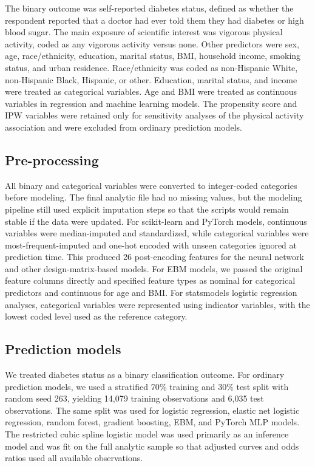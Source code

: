 \documentclass[10pt]{article}
\begin{document}
The binary outcome was self-reported diabetes status, defined as whether the respondent reported that a doctor had ever told them they had diabetes or high blood sugar. The main exposure of scientific interest was vigorous physical activity, coded as any vigorous activity versus none. Other predictors were sex, age, race/ethnicity, education, marital status, BMI, household income, smoking status, and urban residence. Race/ethnicity was coded as non-Hispanic White, non-Hispanic Black, Hispanic, or other. Education, marital status, and income were treated as categorical variables. Age and BMI were treated as continuous variables in regression and machine learning models. The propensity score and IPW variables were retained only for sensitivity analyses of the physical activity association and were excluded from ordinary prediction models.

\subsection*{Pre-processing}

All binary and categorical variables were converted to integer-coded categories before modeling. The final analytic file had no missing values, but the modeling pipeline still used explicit imputation steps so that the scripts would remain stable if the data were updated. For scikit-learn and PyTorch models, continuous variables were median-imputed and standardized, while categorical variables were most-frequent-imputed and one-hot encoded with unseen categories ignored at prediction time. This produced 26 post-encoding features for the neural network and other design-matrix-based models. For EBM models, we passed the original feature columns directly and specified feature types as nominal for categorical predictors and continuous for age and BMI. For statsmodels logistic regression analyses, categorical variables were represented using indicator variables, with the lowest coded level used as the reference category.

\begin{table}[H]
\centering
\caption{Summary statistics for the HRS analytic sample.}
\scriptsize

\end{table}

\subsection*{Prediction models}

We treated diabetes status as a binary classification outcome. For ordinary prediction models, we used a stratified 70\% training and 30\% test split with random seed 263, yielding 14,079 training observations and 6,035 test observations. The same split was used for logistic regression, elastic net logistic regression, random forest, gradient boosting, EBM, and PyTorch MLP models. The restricted cubic spline logistic model was used primarily as an inference model and was fit on the full analytic sample so that adjusted curves and odds ratios used all available observations.
\end{document}
